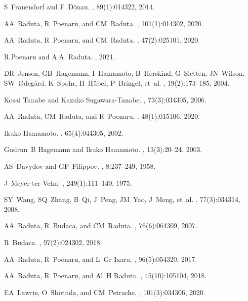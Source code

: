 \documentclass[myclassdoc,debug]{rjparticle}
\begin{document}
\begin{thebibliography}{99}
S~Frauendorf and F~D{\"o}nau.
, 89(1):014322, 2014.

AA~Raduta, R~Poenaru, and CM~Raduta.
, 101(1):014302, 2020.

AA~Raduta, R~Poenaru, and CM~Raduta.
,
  47(2):025101, 2020.

R.Poenaru and A.A. Raduta.
, 2021.

DR~Jensen, GB~Hagemann, I~Hamamoto, B~Herskind, G~Sletten, JN~Wilson,
  SW~{\O}deg{\aa}rd, K~Spohr, H~H{\"u}bel, P~Bringel, et~al.
,
  19(2):173--185, 2004.

Kosai Tanabe and Kazuko Sugawara-Tanabe.
, 73(3):034305, 2006.

AA~Raduta, CM~Raduta, and R~Poenaru.
,
  48(1):015106, 2020.

Ikuko Hamamoto.
, 65(4):044305, 2002.

Gudrun~B Hagemann and Ikuko Hamamoto.
, 13(3):20--24, 2003.

AS~Davydov and GF~Filippov.
, 8:237--249, 1958.

J~Meyer-ter Vehn.
, 249(1):111--140, 1975.

SY~Wang, SQ~Zhang, B~Qi, J~Peng, JM~Yao, J~Meng, et~al.
, 77(3):034314, 2008.

AA~Raduta, R~Budaca, and CM~Raduta.
, 76(6):064309, 2007.

R~Budaca.
, 97(2):024302, 2018.

AA~Raduta, R~Poenaru, and L~Gr Ixaru.
, 96(5):054320, 2017.

AA~Raduta, R~Poenaru, and Al~H Raduta.
,
  45(10):105104, 2018.

EA~Lawrie, O~Shirinda, and CM~Petrache.
, 101(3):034306, 2020.
\end{thebibliography}
\end{document}
